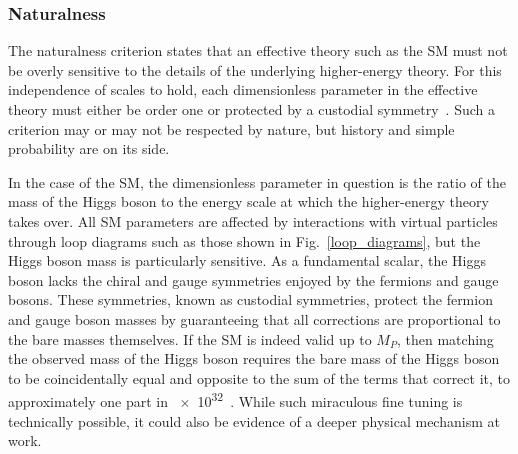 \subsubsection{Naturalness}
The naturalness criterion states that an effective theory such as the SM must not be overly sensitive to the details of the underlying higher-energy theory. For this independence of scales to hold, each dimensionless parameter in the effective theory must either be order one or protected by a custodial symmetry~\cite{thooft_naturalness}. Such a criterion may or may not be respected by nature, but history and simple probability are on its side.

In the case of the SM, the dimensionless parameter in question is the ratio of the mass of the Higgs boson to  the energy scale at which the higher-energy theory takes over. All SM parameters are affected by interactions with virtual particles through loop diagrams such as those shown in Fig.~\ref{loop_diagrams}, but the Higgs boson mass is particularly sensitive. As a fundamental scalar, the Higgs boson lacks the chiral and gauge symmetries enjoyed by the fermions and gauge bosons. These symmetries, known as custodial symmetries, protect the fermion and gauge boson masses by guaranteeing that all corrections are proportional to the bare masses themselves. If the SM is indeed valid up to $M_{P}$, then matching the observed mass of the Higgs boson requires the bare mass of the Higgs boson to be coincidentally equal and opposite to the sum of the terms that correct it, to approximately one part in \num{e32}~\cite{giudice_naturalness_2008}. While such miraculous fine tuning is technically possible, it could also be evidence of a deeper physical mechanism at work.



\pagebreak